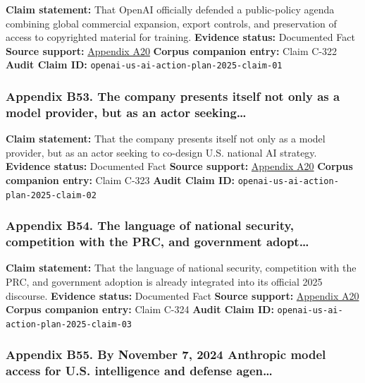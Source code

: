 \documentclass[
  american,
  11pt,
  letterpaper,
]{article}
\begin{document}
\textbf{Claim statement:} That OpenAI officially defended a
public-policy agenda combining global commercial expansion, export
controls, and preservation of access to copyrighted material for
training. \textbf{Evidence status:} Documented Fact \textbf{Source
support:}
\hyperref[appendix-a20-openais-proposals-for-the-us-ai-action-plan]{Appendix
A20} \textbf{Corpus companion entry:} Claim C-322 \textbf{Audit Claim
ID:} \texttt{openai-us-ai-action-plan-2025-claim-01}

\subsubsection{Appendix B53. The company presents itself not only as a
model provider, but as an actor
seeking\ldots{}}\label{appendix-b53-the-company-presents-itself-not-only-as-a-model-provider-but-as-an-actor-seeking}

\textbf{Claim statement:} That the company presents itself not only as a
model provider, but as an actor seeking to co-design U.S. national AI
strategy. \textbf{Evidence status:} Documented Fact \textbf{Source
support:}
\hyperref[appendix-a20-openais-proposals-for-the-us-ai-action-plan]{Appendix
A20} \textbf{Corpus companion entry:} Claim C-323 \textbf{Audit Claim
ID:} \texttt{openai-us-ai-action-plan-2025-claim-02}

\subsubsection{Appendix B54. The language of national security,
competition with the PRC, and government
adopt\ldots{}}\label{appendix-b54-the-language-of-national-security-competition-with-the-prc-and-government-adopt}

\textbf{Claim statement:} That the language of national security,
competition with the PRC, and government adoption is already integrated
into its official 2025 discourse. \textbf{Evidence status:} Documented
Fact \textbf{Source support:}
\hyperref[appendix-a20-openais-proposals-for-the-us-ai-action-plan]{Appendix
A20} \textbf{Corpus companion entry:} Claim C-324 \textbf{Audit Claim
ID:} \texttt{openai-us-ai-action-plan-2025-claim-03}

\subsubsection{Appendix B55. By November 7, 2024 Anthropic model access
for U.S. intelligence and defense
agen\ldots{}}\label{appendix-b55-by-november-7-2024-anthropic-model-access-for-u-s-intelligence-and-defense-agen}
\end{document}

